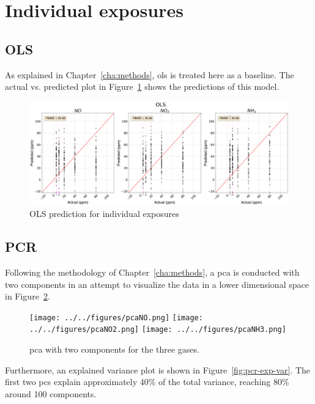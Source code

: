\section{Individual exposures}

\subsection{OLS}

As explained in Chapter~\ref{cha:methods}, \acrshort{ols} is treated here as a baseline. The actual vs. predicted plot in Figure~\ref{fig:ols-exposures} shows the predictions of this model.

\begin{figure}[h]
	\centering
	\includegraphics[width=1\textwidth]{../figures/ols-exposures.png}
	\caption{OLS prediction for individual exposures}
	\label{fig:ols-exposures}
\end{figure}

\subsection{PCR}
\label{subsec:pcr1}

Following the methodology of Chapter~\ref{cha:methods}, a \acrshort{pca} is conducted with two components in an attempt to visualize the data in a lower dimensional space in Figure~\ref{fig:pca}. 

\begin{figure}[!htb]
	\centering
	\texttt{[image: ../../figures/pcaNO.png]}
	\hfill
	\texttt{[image: ../../figures/pcaNO2.png]}
	\hfill
	\texttt{[image: ../../figures/pcaNH3.png]}
	\caption{\acrshort{pca} with two components for the three gases.}
	
\label{fig:pca}
\end{figure}

Furthermore, an explained variance plot is shown in Figure~\ref{fig:pcr-exp-var}. The first two \acrshort{pc}s explain approximately 40\% of the total variance, reaching 80\% around 100 components.

